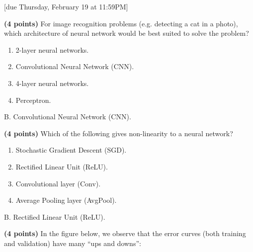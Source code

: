 \documentclass{article}
\begin{document}
[due Thursday, February 19 at 11:59PM]

\begin{probset}
\begin{prob}
    \begin{subprobset}
    \begin{subprob}
        \textbf{(4 points)} For image recognition problems (e.g. detecting a cat in a photo), which architecture of neural network would be best suited to solve the problem?

        \begin{enumerate}[label=\Alph*.]
            \item 2-layer neural networks.
            \item Convolutional Neural Network (CNN).
            \item 4-layer neural networks.
            \item Perceptron.
        \end{enumerate}

        \begin{soln}
            B. Convolutional Neural Network (CNN).
        \end{soln}
    \end{subprob}

    \begin{subprob}
        \textbf{(4 points)} Which of the following gives non-linearity to a neural network?

        \begin{enumerate}[label=\Alph*.]
            \item Stochastic Gradient Descent (SGD).
            \item Rectified Linear Unit (ReLU).
            \item Convolutional layer (Conv).
            \item Average Pooling layer (AvgPool).
        \end{enumerate}

        \begin{soln}
            B. Rectified Linear Unit (ReLU).
        \end{soln}
    \end{subprob}

    \begin{subprob}
        \textbf{(4 points)} In the figure below, we observe that the error curves (both training and validation) have many “ups and downs”:


\end{subprob}
\end{subprobset}
\end{prob}
\end{probset}
\end{document}
